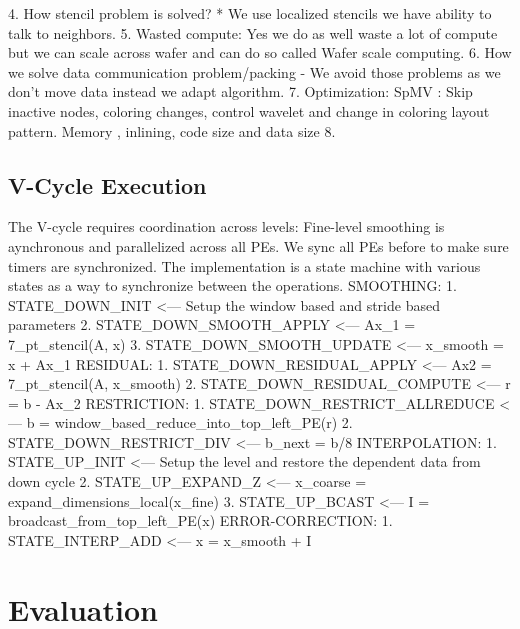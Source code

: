 \documentclass[sigconf]{acmart}
\begin{document}
    4. How stencil problem is solved? 
        * We use localized stencils we have ability to talk to neighbors.
    5. Wasted compute: Yes we do as well waste a lot of compute but we can scale across wafer and can do so called Wafer scale computing. 
    6. How we solve data communication problem/packing - We avoid those problems as we don't move data instead we adapt algorithm. 
    7. Optimization: 
        SpMV : Skip inactive nodes, coloring changes, control wavelet and change in coloring layout pattern.
        Memory , inlining, code size and data size
    8. 

    \subsection{V-Cycle Execution}

    The V-cycle requires coordination across levels: Fine-level smoothing is aynchronous and parallelized across all PEs. We sync all PEs before to make sure timers are synchronized. The implementation is a state machine with various states as a way to synchronize between the operations.
    SMOOTHING:
    1. STATE_DOWN_INIT          <--- Setup the window based and stride based parameters
    2. STATE_DOWN_SMOOTH_APPLY  <--- Ax_1 = 7_pt_stencil(A, x)
    3. STATE_DOWN_SMOOTH_UPDATE <--- x_smooth = x + Ax_1
    RESIDUAL:
    1. STATE_DOWN_RESIDUAL_APPLY    <--- Ax2 = 7_pt_stencil(A, x_smooth)
    2. STATE_DOWN_RESIDUAL_COMPUTE  <---   r = b - Ax_2
    RESTRICTION:
    1. STATE_DOWN_RESTRICT_ALLREDUCE <--- b = window_based_reduce_into_top_left_PE(r)
    2. STATE_DOWN_RESTRICT_DIV       <--- b_next = b/8
    INTERPOLATION:
    1. STATE_UP_INIT                <--- Setup the level and restore the dependent data from down cycle
    2. STATE_UP_EXPAND_Z            <--- x_coarse = expand_dimensions_local(x_fine)
    3. STATE_UP_BCAST               <--- I = broadcast_from_top_left_PE(x)
    ERROR-CORRECTION:
    1. STATE_INTERP_ADD             <--- x = x_smooth + I

\section{Evaluation}

\end{document}
